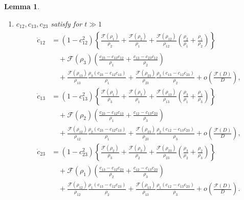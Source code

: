\documentclass[reqno]{amsart}
\theoremstyle{plain}
\newtheorem{lemma}[theorem]{Lemma}
\theoremstyle{definition}
\numberwithin{equation}{section}
\newcommand{\1}{\mathbbm{1}}
\begin{document}
\begin{lemma}
\begin{enumerate}
\item $c_{12},c_{13},c_{23}$ satisfy for $t\gg 1$
\begin{align}\label{ces1}
\begin{aligned}
\dot{c}_{12}&=(1-c_{12}^2)\left\{\frac{\mathcal{F}(\rho_1)}{\rho_2}+\frac{\mathcal{F}(\rho_2)}{\rho_1}+\frac{\mathcal{F}(\rho_{12})}{\rho_{12}}\left(\frac{\rho_2}{\rho_1}+\frac{\rho_1}{\rho_2}\right)\right\}
\\
&\quad+\mathcal{F}(\rho_3)\left( \frac{c_{23}-c_{13}c_{12}}{\rho_1}+\frac{c_{13}-c_{23}c_{12}}{\rho_2}\right)
\\
&\quad+\frac{\mathcal{F}(\rho_{13})}{\rho_{13}}\frac{\rho_3(c_{23}-c_{12}c_{13})}{\rho_1}+\frac{\mathcal{F}(\rho_{23})}{\rho_{23}}\frac{\rho_3(c_{13}-c_{12}c_{23})}{\rho_2}+o\left(\frac{\mathcal{F}(D)}{D}\right),
\\
\dot{c}_{13}&=(1-c_{13}^2)\left\{\frac{\mathcal{F}(\rho_1)}{\rho_3}+\frac{\mathcal{F}(\rho_3)}{\rho_1}+\frac{\mathcal{F}(\rho_{13})}{\rho_{13}}\left(\frac{\rho_3}{\rho_1}+\frac{\rho_1}{\rho_3}\right)\right\}
\\
&\quad+\mathcal{F}(\rho_2)\left( \frac{c_{23}-c_{12}c_{13}}{\rho_1}+\frac{c_{12}-c_{13}c_{23}}{\rho_3}\right)
\\
&\quad+\frac{\mathcal{F}(\rho_{12})}{\rho_{12}}\frac{\rho_2(c_{23}-c_{12}c_{13})}{\rho_1}+\frac{\mathcal{F}(\rho_{23})}{\rho_{23}}\frac{\rho_2(c_{12}-c_{13}c_{23})}{\rho_3}+o\left(\frac{\mathcal{F}(D)}{D}\right),
\\
\dot{c}_{23}&=(1-c_{23}^2)\left\{\frac{\mathcal{F}(\rho_2)}{\rho_3}+\frac{\mathcal{F}(\rho_3)}{\rho_2}+\frac{\mathcal{F}(\rho_{23})}{\rho_{23}}\left(\frac{\rho_3}{\rho_2}+\frac{\rho_2}{\rho_3}\right)\right\}
\\
&\quad+\mathcal{F}(\rho_1)\left( \frac{c_{13}-c_{12}c_{23}}{\rho_2}+\frac{c_{12}-c_{13}c_{23}}{\rho_3}\right)
\\
&\quad+\frac{\mathcal{F}(\rho_{12})}{\rho_{12}}\frac{\rho_1(c_{13}-c_{12}c_{23})}{\rho_2}+\frac{\mathcal{F}(\rho_{13})}{\rho_{13}}\frac{\rho_1(c_{12}-c_{13}c_{23})}{\rho_3}+o\left(\frac{\mathcal{F}(D)}{D}\right).
\end{aligned}
\end{align}


\end{enumerate}
\end{lemma}
\end{document}
